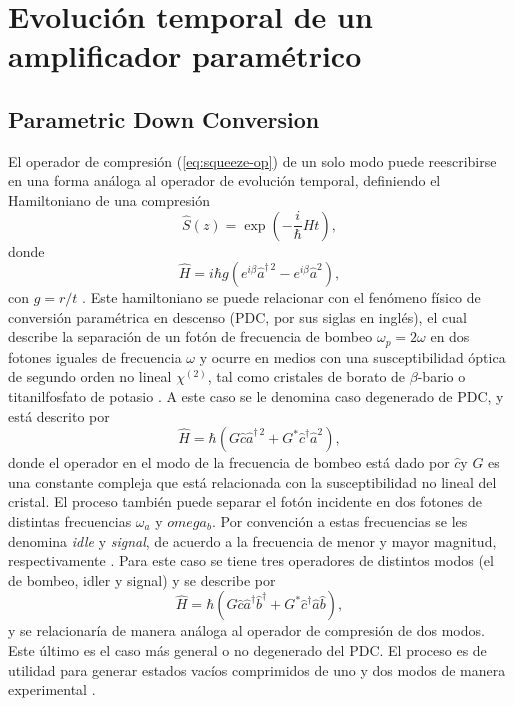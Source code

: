 \chapter{Evolución temporal de un amplificador paramétrico}

\section{Parametric Down Conversion}
El operador de compresión (\ref{eq:squeeze-op}) de un solo modo puede reescribirse en una forma análoga al operador de evolución temporal, definiendo el Hamiltoniano de una compresión
\begin{equation}\label{eq:squeeze-op-time-ev}
  \hat{S}(z) = \exp(-\frac{i}{\hbar}Ht),
\end{equation}
donde
\begin{equation} \label{eq:hamiltionian-squeeze}
  \hat{H} = i\hbar g (e^{i\beta}\hat{a}^{\dagger\,2} - e^{i\beta}\hat{a}^2),
\end{equation}
con $g=r/t$ \cite{Agarwal_2012}.
Este hamiltoniano se puede relacionar con el fenómeno físico de conversión paramétrica en descenso (PDC, por sus siglas en inglés), el cual describe la separación de un fotón de frecuencia de bombeo $\omega_p=2\omega$ en dos fotones iguales de frecuencia $\omega$ y ocurre en medios con una susceptibilidad óptica de segundo orden no lineal $\chi^{(2)}$, tal como cristales de borato de $\beta$-bario o titanilfosfato de potasio \cite{Leonhardt}. A este caso se le denomina caso degenerado de PDC, y está descrito por
\begin{equation}
  \hat{H} = \hbar (G \hat{c} \hat{a}^{\dagger\,2} + G^* \hat{c}^{\dagger}\hat{a}^2),
\end{equation}
donde el operador  en el modo de la frecuencia de bombeo está dado por $\hat{c}$y $G$ es una constante compleja que está relacionada con la susceptibilidad no lineal  del cristal. El proceso también puede separar el fotón incidente en dos fotones de distintas frecuencias $\omega_a$ y $omega_b$. Por convención a estas frecuencias se les denomina \textit{idle} y \textit{signal}, de acuerdo a la frecuencia de menor y mayor magnitud, respectivamente \cite{Loudon}. Para este caso se tiene tres operadores de distintos modos (el de bombeo, idler y signal) y se describe por
\begin{equation}
  \hat{H} = \hbar(G \hat{c} \hat{a}^{\dagger} \hat{b}^{\dagger} + G^* \hat{c}^{\dagger} \hat{a} \hat{b}),
\end{equation}
y se relacionaría de manera análoga al operador de compresión de dos modos. Este último es el caso más general o no degenerado del PDC. El proceso es de utilidad para generar estados vacíos comprimidos de uno y dos modos de manera experimental \cite{Walls}.

